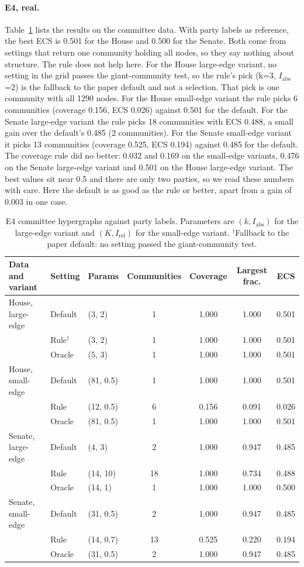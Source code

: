 \documentclass[11pt,a4paper]{article}
\newcommand{\Iabs}{I_{\mathrm{abs}}}
\newcommand{\Irel}{I_{\mathrm{rel}}}
\begin{document}
\paragraph{E4, real.} Table~\ref{tab:e4} lists the results on the committee data. With party labels as reference, the best ECS is 0.501 for the House and 0.500 for the Senate. Both come from settings that return one community holding all nodes, so they say nothing about structure. The rule does not help here. For the House large-edge variant, no setting in the grid passes the giant-community test, so the rule's pick (k=3, $\Iabs$=2) is the fallback to the paper default and not a selection. That pick is one community with all 1290 nodes. For the House small-edge variant the rule picks 6 communities (coverage 0.156, ECS 0.026) against 0.501 for the default. For the Senate large-edge variant the rule picks 18 communities with ECS 0.488, a small gain over the default's 0.485 (2 communities). For the Senate small-edge variant it picks 13 communities (coverage 0.525, ECS 0.194) against 0.485 for the default. The coverage rule did no better: 0.032 and 0.169 on the small-edge variants, 0.476 on the Senate large-edge variant and 0.501 on the House large-edge variant. The best values sit near 0.5 and there are only two parties, so we read these numbers with care. Here the default is as good as the rule or better, apart from a gain of 0.003 in one case.

\begin{table}[tbp]
\centering
\footnotesize
\caption{E4 committee hypergraphs against party labels. Parameters are $(k,\Iabs)$ for the large-edge variant and $(K,\Irel)$ for the small-edge variant. $^\dagger$Fallback to the paper default: no setting passed the giant-community test.}\label{tab:e4}
\begin{tabular}{lllcccc}
\toprule
Data and variant & Setting & Params & Communities & Coverage & Largest frac. & ECS \\
\midrule
House, large-edge & Default & (3, 2) & 1 & 1.000 & 1.000 & 0.501 \\
 & Rule$^\dagger$ & (3, 2) & 1 & 1.000 & 1.000 & 0.501 \\
 & Oracle & (5, 3) & 1 & 1.000 & 1.000 & 0.501 \\
House, small-edge & Default & (81, 0.5) & 1 & 1.000 & 1.000 & 0.501 \\
 & Rule & (12, 0.5) & 6 & 0.156 & 0.091 & 0.026 \\
 & Oracle & (81, 0.5) & 1 & 1.000 & 1.000 & 0.501 \\
Senate, large-edge & Default & (4, 3) & 2 & 1.000 & 0.947 & 0.485 \\
 & Rule & (14, 10) & 18 & 1.000 & 0.734 & 0.488 \\
 & Oracle & (14, 1) & 1 & 1.000 & 1.000 & 0.500 \\
Senate, small-edge & Default & (31, 0.5) & 2 & 1.000 & 0.947 & 0.485 \\
 & Rule & (14, 0.7) & 13 & 0.525 & 0.220 & 0.194 \\
 & Oracle & (31, 0.5) & 2 & 1.000 & 0.947 & 0.485 \\
\bottomrule
\end{tabular}
\end{table}
\end{document}
